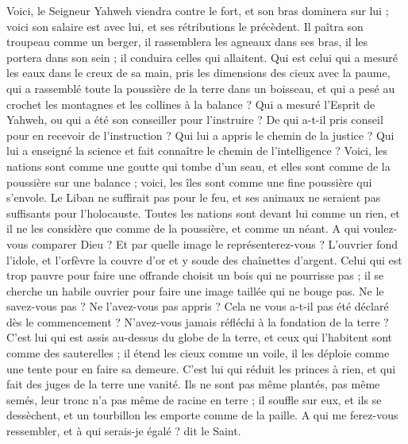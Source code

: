 \begin{multicols}{2}
Voici, le Seigneur Yahweh viendra contre le fort, et son bras dominera sur lui ; voici son salaire est avec lui, et ses rétributions le précèdent.
Il paîtra son troupeau comme un berger, il rassemblera les agneaux dans ses bras, il les portera dans son sein ; il conduira celles qui allaitent.
Qui est celui qui a mesuré les eaux dans le creux de sa main, pris les dimensions des cieux avec la paume, qui a rassemblé toute la poussière de la terre dans un boisseau, et qui a pesé au crochet les montagnes et les collines à la balance ?
Qui a mesuré l'Esprit de Yahweh, ou qui a été son conseiller pour l'instruire ?
De qui a-t-il pris conseil pour en recevoir de l'instruction ? Qui lui a appris le chemin de la justice ? Qui lui a enseigné la science et fait connaître le chemin de l'intelligence ?
Voici, les nations sont comme une goutte qui tombe d'un seau, et elles sont comme de la poussière sur une balance ; voici, les îles sont comme une fine poussière qui s'envole.
Le Liban ne suffirait pas pour le feu, et ses animaux ne seraient pas suffisants pour l'holocauste.
Toutes les nations sont devant lui comme un rien, et il ne les considère que comme de la poussière, et comme un néant.
A qui voulez-vous comparer Dieu ? Et par quelle image le représenterez-vous ?
L'ouvrier fond l'idole, et l'orfèvre la couvre d'or et y soude des chaînettes d'argent.
Celui qui est trop pauvre pour faire une offrande choisit un bois qui ne pourrisse pas ; il se cherche un habile ouvrier pour faire une image taillée qui ne bouge pas.
Ne le savez-vous pas ? Ne l'avez-vous pas appris ? Cela ne vous a-t-il pas été déclaré dès le commencement ? N'avez-vous jamais réfléchi à la fondation de la terre ?
C'est lui qui est assis au-dessus du globe de la terre, et ceux qui l'habitent sont comme des sauterelles ; il étend les cieux comme un voile, il les déploie comme une tente pour en faire sa demeure.
C'est lui qui réduit les princes à rien, et qui fait des juges de la terre une vanité.
Ils ne sont pas même plantés, pas même semés, leur tronc n'a pas même de racine en terre ; il souffle sur eux, et ils se dessèchent, et un tourbillon les emporte comme de la paille.
A qui me ferez-vous ressembler, et à qui serais-je égalé ? dit le Saint.

\end{multicols}
